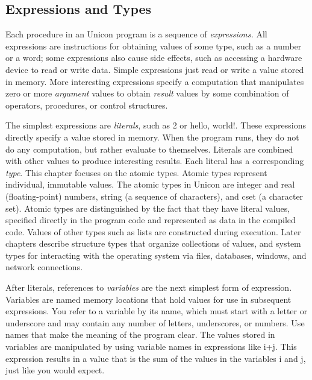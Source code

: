 \subsection{Expressions and Types}

Each procedure in an Unicon program is a sequence of
\textit{expression}\textit{s.} All expressions are
instructions for obtaining values of some
type, such as a number or a word; some expressions also
cause side effects, such as accessing a hardware device to read or
write data. Simple expressions just read or write a value stored in
memory. More interesting expressions specify a computation that
manipulates zero or more \textit{argument} values to
obtain \textit{result} values by some combination of
operators, procedures, or control structures.

The simplest expressions are \textit{literal}\textit{s},
such as \textsf{2} or \textsf{{\textquotedbl}hello,
world!{\textquotedbl}}\textsf{. }These expressions directly specify a
value stored in memory. When the program runs, they do not do any
computation, but rather evaluate to themselves. Literals are combined
with other values to produce interesting results. Each literal has a
corresponding \textit{type}. This chapter focuses on the atomic types. Atomic types represent individual, immutable values. The atomic types in Unicon are
integer and real (floating-point)
numbers, string (a sequence of characters), and
cset (a character set). Atomic types
are distinguished by the fact that they have literal values, specified
directly in the program code and represented as data in the compiled
code. Values of other types such as lists are constructed during
execution. Later chapters describe structure types that organize
collections of values, and system types for interacting with the
operating system via files, databases, windows, and network
connections. 

After literals, references to
\textit{variable}\textit{s} are the next simplest form
of expression. Variables are named memory locations that hold values
for use in subsequent expressions. You refer to a variable by its name,
which must start with a letter or underscore and may contain any number
of letters, underscores, or numbers. Use names that make the meaning of
the program clear. The values stored in variables are manipulated by
using variable names in expressions like \textsf{i+j}. This expression
results in a value that is the sum of the values in the variables
\textsf{i} and \textsf{j}, just like you would expect.

